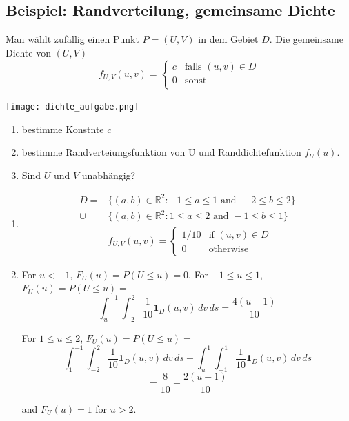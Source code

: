\BoxEnd{}
\BoxStart{}
\subsection{Beispiel: Randverteilung, gemeinsame Dichte}
\begin{tiny}
Man wählt zufällig einen Punkt $P = (U, V)$ in dem Gebiet $D$. Die gemeinsame Dichte von $(U, V)$
\[
  f_{U, V} (u, v) =
  \begin{cases}
    c & \text{falls } (u, v) \in D \\
    0 & \text{sonst}               \\
  \end{cases}
\]
\begin{center}
  \texttt{[image: dichte\_aufgabe.png]}
\end{center}
\begin{enumerate}[noitemsep,topsep=0pt,parsep=0pt,partopsep=0pt]  
  \item bestimme Konstnte $c$
  \item bestimme Randverteiungsfunktion von U und Randdichtefunktion $f_U(u)$.
  \item Sind $U$ und $V$ unabhängig?
\end{enumerate}
\begin{enumerate}[noitemsep,topsep=0pt,parsep=0pt,partopsep=0pt]  
  \item 
\begin{align*}
  D =  & \{(a, b) \in \mathbb{R}^2 : -1 \leq a \leq 1 \text{ and } -2 \leq b \leq 2\} \\
  \cup & \{(a, b) \in \mathbb{R}^2 : 1 \leq a \leq 2 \text{ and } -1 \leq b \leq 1\}  \\
       & f_{U,V}(u, v) =
  \begin{cases}
    1/10 & \text{if } (u, v) \in D \\
    0    & \text{otherwise}
  \end{cases}
\end{align*}
\item For $u < -1$, $F_U(u) = P(U \leq u) = 0$.
For $-1 \leq u \leq 1$, $F_U(u) = P(U \leq u) = $
\[
  \int_u^{-1} \int_{-2}^{2} \frac{1}{10} \mathbf{1}_D(u, v) \, dv \, ds = \frac{4(u + 1)}{10}
\]

For $1 \leq u \leq 2$, $F_U(u) = P(U \leq u) =$
\[
  \int_1^{-1} \int_{-2}^{2} \frac{1}{10} \mathbf{1}_D(u, v) \, dv \, ds + \int_u^1 \int_{-1}^{1} \frac{1}{10} \mathbf{1}_D(u, v) \, dv \, ds
\]
\[
  = \frac{8}{10} + \frac{2(u - 1)}{10}
\]

and $F_U(u) = 1$ for $u > 2$.


\end{enumerate}
\end{tiny}
